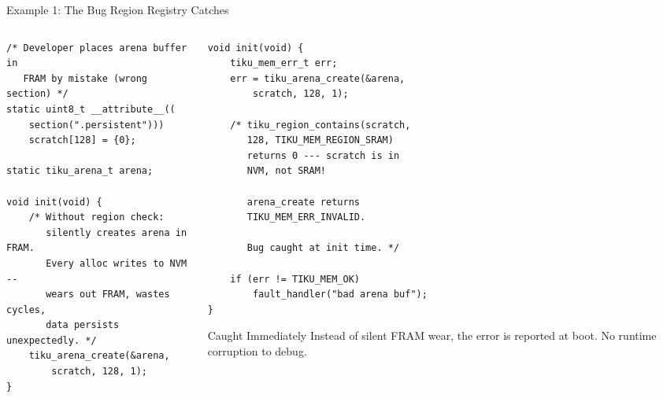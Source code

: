 \documentclass[aspectratio=169, 10pt]{beamer}
\begin{document}
\begin{frame}[fragile]{Example 1: The Bug Region Registry Catches}
\begin{columns}[T]
\begin{column}{0.48\textwidth}
\begin{lstlisting}[style=cstyle, title={Bug: arena in FRAM}]
/* Developer places arena buffer in
   FRAM by mistake (wrong section) */
static uint8_t __attribute__((
    section(".persistent")))
    scratch[128] = {0};

static tiku_arena_t arena;

void init(void) {
    /* Without region check:
       silently creates arena in FRAM.
       Every alloc writes to NVM --
       wears out FRAM, wastes cycles,
       data persists unexpectedly. */
    tiku_arena_create(&arena,
        scratch, 128, 1);
}
\end{lstlisting}
\end{column}

\begin{column}{0.48\textwidth}
\begin{lstlisting}[style=cstyle, title={With region registry}]
void init(void) {
    tiku_mem_err_t err;
    err = tiku_arena_create(&arena,
        scratch, 128, 1);

    /* tiku_region_contains(scratch,
       128, TIKU_MEM_REGION_SRAM)
       returns 0 --- scratch is in
       NVM, not SRAM!

       arena_create returns
       TIKU_MEM_ERR_INVALID.

       Bug caught at init time. */

    if (err != TIKU_MEM_OK)
        fault_handler("bad arena buf");
}
\end{lstlisting}

\begin{alertblock}{Caught Immediately}
Instead of silent FRAM wear, the error is reported
at boot.  No runtime corruption to debug.
\end{alertblock}
\end{column}
\end{columns}
\end{frame}
\end{document}
